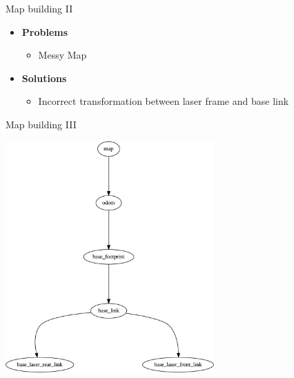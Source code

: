 \begin{frame}{Map building II}
\begin{itemize}
	\item \textbf{Problems}
		\begin{itemize}
			\item Messy Map
		\end{itemize}
	\item \textbf{Solutions}
		\begin{itemize}
			\item Incorrect transformation between laser frame and base link
		\end{itemize}
\end{itemize}
\end{frame}
\begin{frame}{Map building III}
    \begin{center}
    \includegraphics[width=0.6\textwidth]{gfx/frames_cleaned.pdf}
    \end{center}
\end{frame}
